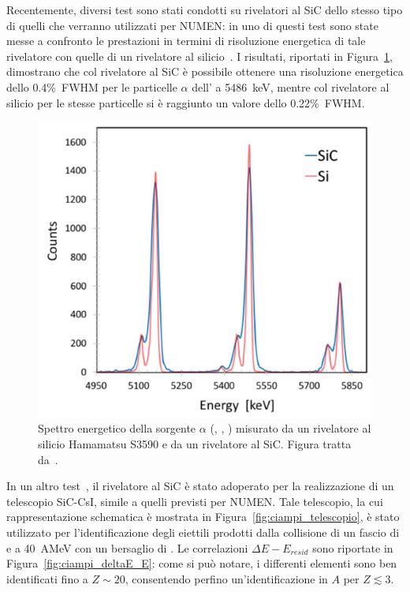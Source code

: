 Recentemente, diversi test sono stati condotti su rivelatori al SiC dello stesso tipo di quelli che verranno utilizzati per NUMEN: in uno di questi test sono state messe a confronto le prestazioni in termini di risoluzione energetica di tale rivelatore con quelle di un rivelatore al silicio~\cite{tudisco:sensors18}.
I risultati, riportati in Figura~\ref{fig:tudisco_spettro}, dimostrano che col rivelatore al SiC è possibile ottenere una risoluzione energetica dello 0.4\%~FWHM per le particelle $\alpha$ dell' a 5486~keV, mentre col rivelatore al silicio per le stesse particelle si è raggiunto un valore dello 0.22\%~FWHM.
\begin{figure} [!p]
	\centering
	\includegraphics[width=\textwidth, keepaspectratio]{Grafici/spettro_sic_tagliato.png}
	\caption{Spettro energetico della sorgente $\alpha$ (, , ) misurato da un rivelatore al silicio Hamamatsu S3590 e da un rivelatore al SiC. Figura tratta da~\cite{tudisco:sensors18}.} \label{fig:tudisco_spettro}
\end{figure}
In un altro test~\cite{ciampi:nima19}, il rivelatore al SiC è stato adoperato per la realizzazione di un telescopio SiC-CsI, simile a quelli previsti per NUMEN.
Tale telescopio, la cui rappresentazione schematica è mostrata in Figura~\ref{fig:ciampi_telescopio}, è stato utilizzato per l'identificazione degli eiettili prodotti dalla collisione di un fascio di  e  a 40~AMeV con un bersaglio di . 
Le correlazioni $\Delta E - E_{resid}$ sono riportate in Figura~\ref{fig:ciampi_deltaE_E}: come si può notare, i differenti elementi sono ben identificati fino a $Z \sim 20$, consentendo perfino un'identificazione in $A$ per $Z \lesssim 3$.



